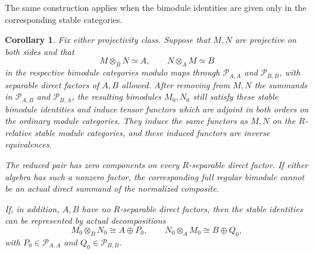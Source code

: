\documentclass[12pt,a4paper,english,reqno]{amsart}
\numberwithin{equation}{section}
\theoremstyle{plain}
\newtheorem{corollary}[theorem]{Corollary}
\theoremstyle{definition}
\begin{document}
The same construction applies when the bimodule identities are given
only in the corresponding stable categories.

\begin{corollary}
\label{cor:adjoint-relative-stable-identities}
Fix either projectivity class.  Suppose that $M,N$ are
projective on both sides and that
\[
 M\otimes_BN\simeq A,
 \qquad N\otimes_AM\simeq B
\]
in the respective bimodule categories modulo maps through
$\mathcal P_{A,A}$ and $\mathcal P_{B,B}$, with separable direct factors
of $A,B$ allowed.  After removing from $M,N$
the summands in $\mathcal P_{A,B}$ and $\mathcal P_{B,A}$, the resulting
bimodules $M_0,N_0$ still satisfy these stable bimodule identities
and induce tensor functors which are adjoint in both orders on the
ordinary module categories.
They induce the same functors as $M,N$ on the $R$-relative stable
module categories, and these induced functors are inverse
equivalences.

The reduced pair has zero components on every $R$-separable
direct factor.  If either algebra has such a nonzero factor, the
corresponding full regular bimodule cannot be an actual direct
summand of the normalized composite.

If, in addition, $A,B$ have no $R$-separable direct factors, then
the stable identities can be represented by actual decompositions
\[
 M_0\otimes_BN_0\cong A\oplus P_0,
 \qquad N_0\otimes_AM_0\cong B\oplus Q_0,
\]
with $P_0\in\mathcal P_{A,A}$ and $Q_0\in\mathcal P_{B,B}$.
\end{corollary}
\end{document}
